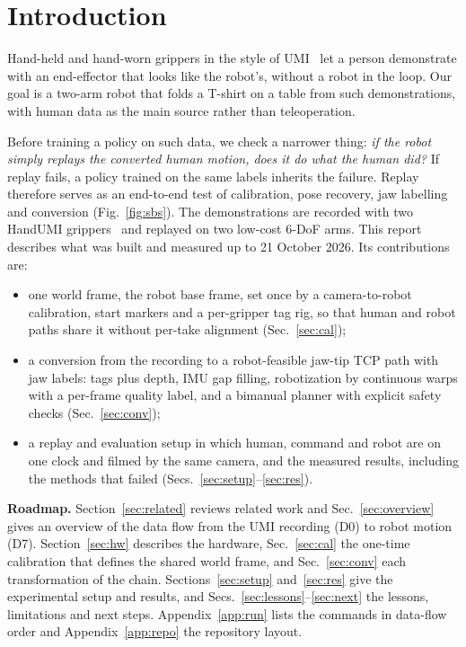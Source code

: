 \documentclass[conference,10pt]{IEEEtran}
\begin{document}
\section{Introduction}\label{sec:intro}
Hand-held and hand-worn grippers in the style of UMI~\cite{chi2024umi} let a person demonstrate with an end-effector that
looks like the robot's, without a robot in the loop. Our goal is a two-arm robot that folds a T-shirt on a table from
such demonstrations, with human data as the main source rather than teleoperation.

Before training a policy on such data, we check a narrower thing: \emph{if the robot simply replays the converted human
motion, does it do what the human did?} If replay fails, a policy trained on the same labels inherits the failure. Replay
therefore serves as an end-to-end test of calibration, pose recovery, jaw labelling and conversion
(Fig.~\ref{fig:sbs}). The demonstrations are recorded with two HandUMI grippers~\cite{handumi,meza2026handumi} and
replayed on two low-cost 6-DoF arms. This report describes what was built and measured up to 21 October 2026. Its
contributions are:
\begin{itemize}
\item one world frame, the robot base frame, set once by a camera-to-robot calibration, start markers and a per-gripper tag
  rig, so that human and robot paths share it without per-take alignment (Sec.~\ref{sec:cal});
\item a conversion from the recording to a robot-feasible jaw-tip TCP path with jaw labels: tags plus depth, IMU gap
  filling, robotization by continuous warps with a per-frame quality label, and a bimanual planner with explicit safety
  checks (Sec.~\ref{sec:conv});
\item a replay and evaluation setup in which human, command and robot are on one clock and filmed by the same camera, and
  the measured results, including the methods that failed (Secs.~\ref{sec:setup}--\ref{sec:res}).
\end{itemize}

\textbf{Roadmap.} Section~\ref{sec:related} reviews related work and Sec.~\ref{sec:overview} gives an overview of the data flow
from the UMI recording (D0) to robot motion (D7). Section~\ref{sec:hw} describes the hardware, Sec.~\ref{sec:cal} the
one-time calibration that defines the shared world frame, and Sec.~\ref{sec:conv} each transformation of the chain.
Sections~\ref{sec:setup} and~\ref{sec:res} give the experimental setup and results, and
Secs.~\ref{sec:lessons}--\ref{sec:next} the lessons, limitations and next steps. Appendix~\ref{app:run} lists the
commands in data-flow order and Appendix~\ref{app:repo} the repository layout.
\end{document}
